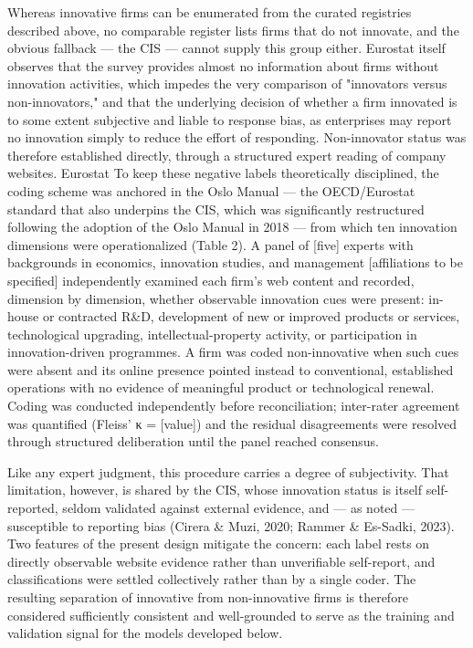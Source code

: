 \documentclass[runningheads]{llncs}
\begin{document}
Whereas innovative firms can be enumerated from the curated registries described above, no comparable register lists firms that do not innovate, and the obvious fallback — the CIS — cannot supply this group either. Eurostat itself observes that the survey provides almost no information about firms without innovation activities, which impedes the very comparison of "innovators versus non-innovators," and that the underlying decision of whether a firm innovated is to some extent subjective and liable to response bias, as enterprises may report no innovation simply to reduce the effort of responding. Non-innovator status was therefore established directly, through a structured expert reading of company websites. Eurostat
To keep these negative labels theoretically disciplined, the coding scheme was anchored in the Oslo Manual — the OECD/Eurostat standard that also underpins the CIS, which was significantly restructured following the adoption of the Oslo Manual in 2018 — from which ten innovation dimensions were operationalized (Table 2). A panel of [five] experts with backgrounds in economics, innovation studies, and management [affiliations to be specified] independently examined each firm's web content and recorded, dimension by dimension, whether observable innovation cues were present: in-house or contracted R\&D, development of new or improved products or services, technological upgrading, intellectual-property activity, or participation in innovation-driven programmes. A firm was coded non-innovative when such cues were absent and its online presence pointed instead to conventional, established operations with no evidence of meaningful product or technological renewal. Coding was conducted independently before reconciliation; inter-rater agreement was quantified (Fleiss' κ = [value]) and the residual disagreements were resolved through structured deliberation until the panel reached consensus. 

Like any expert judgment, this procedure carries a degree of subjectivity. That limitation, however, is shared by the CIS, whose innovation status is itself self-reported, seldom validated against external evidence, and — as noted — susceptible to reporting bias (Cirera \& Muzi, 2020; Rammer \& Es-Sadki, 2023). Two features of the present design mitigate the concern: each label rests on directly observable website evidence rather than unverifiable self-report, and classifications were settled collectively rather than by a single coder. The resulting separation of innovative from non-innovative firms is therefore considered sufficiently consistent and well-grounded to serve as the training and validation signal for the models developed below.
\end{document}
